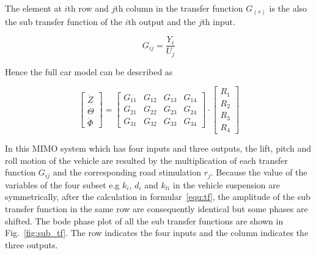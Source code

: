  The element at $i$th row and $j$th column in the transfer function $G_(s)$ is the also the sub transfer function of the $i$th output and the $j$th input.
 
 \begin{equation}
     G_{ij}=\frac{Y_i}{U_j}
 \end{equation}
 
 Hence the full car model can be described as
 
 \begin{equation}
     \begin{bmatrix}
     \ddot{Z}\\
     \ddot{\Theta}\\
     \ddot{\Phi}
     \end{bmatrix}=\begin{bmatrix}
 G_{11} & G_{12} & G_{13} & G_{14}\\
 G_{21} & G_{22} & G_{23} & G_{24}\\
 G_{31} & G_{32} & G_{33} & G_{34}
 \end{bmatrix} \cdot
 \begin{bmatrix}
 R_1\\
 R_2\\
 R_3\\
 R_4
 \end{bmatrix}
 \end{equation}
 
 In this \ac{MIMO} system which has four inputs and three outputs, the lift, pitch and roll motion of the vehicle are resulted by the multiplication of each transfer function $G_{ij}$ and the corresponding road stimulation $r_{j}$.
 Because the value of the variables of the four subset e.g $k_i$, $d_i$ and $k_{ti}$ in the vehicle suspension are symmetrically, after the calculation in formular~\ref{equ:tf}, the amplitude of the sub transfer function in the same row are consequently identical but some phases are shifted.
 The bode phase plot of all the sub transfer functions are shown in Fig.~\ref{fig:sub_tf}.
 The row indicates the four inputs and the column indicates the three outputs.
 
